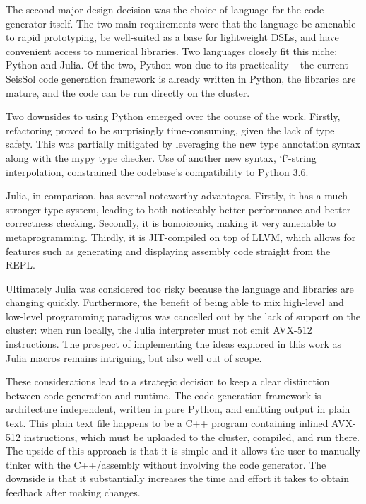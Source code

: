 The second major design decision was the choice of language for the code generator itself. The two main requirements were that the language be amenable to rapid prototyping, be well-suited as a base for lightweight DSLs, and have convenient access to numerical libraries. Two languages closely fit this niche: Python and Julia. Of the two, Python won due to its practicality -- the current SeisSol code generation framework is already written in Python, the libraries are mature, and the code can be run directly on the cluster. 

Two downsides to using Python emerged over the course of the work. Firstly, refactoring proved to be surprisingly time-consuming, given the lack of type safety. This was partially mitigated by leveraging the new type annotation syntax along with the mypy type checker. Use of another new syntax, `f'-string interpolation, constrained the codebase's compatibility to Python 3.6. 

Julia, in comparison, has several noteworthy advantages. Firstly, it has a much stronger type system, leading to both noticeably better performance and better correctness checking. Secondly, it is homoiconic, making it very amenable to metaprogramming. Thirdly, it is JIT-compiled on top of LLVM, which allows for features such as generating and displaying assembly code straight from the REPL. 

Ultimately Julia was considered too risky because the language and libraries are changing quickly. Furthermore, the benefit of being able to mix high-level and low-level programming paradigms was cancelled out by the lack of support on the cluster: when run locally, the Julia interpreter must not emit AVX-512 instructions. The prospect of implementing the ideas explored in this work as Julia macros remains intriguing, but also well out of scope.

These considerations lead to a strategic decision to keep a clear distinction between code generation and runtime. The code generation framework is architecture independent, written in pure Python, and emitting output in plain text. This plain text file happens to be a C++ program containing inlined AVX-512 instructions, which must be uploaded to the cluster, compiled, and run there. The upside of this approach is that it is simple and it allows the user to manually tinker with the C++/assembly without involving the code generator. The downside is that it substantially increases the time and effort it takes to obtain feedback after making changes. 



